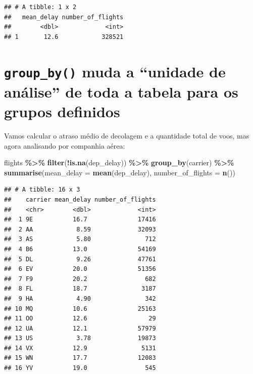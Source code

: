 \documentclass[
]{book}
\newenvironment{Shaded}{\begin{snugshade}}{\end{snugshade}}
\newcommand{\AttributeTok}[1]{\textcolor[rgb]{0.13,0.29,0.53}{#1}}
\newcommand{\FunctionTok}[1]{\textcolor[rgb]{0.13,0.29,0.53}{\textbf{#1}}}
\newcommand{\NormalTok}[1]{#1}
\newcommand{\SpecialCharTok}[1]{\textcolor[rgb]{0.81,0.36,0.00}{\textbf{#1}}}
\begin{document}
\begin{verbatim}
## # A tibble: 1 x 2
##   mean_delay number_of_flights
##        <dbl>             <int>
## 1       12.6            328521
\end{verbatim}

\section{\texorpdfstring{\texttt{group\_by()} muda a ``unidade de análise'' de toda a tabela para os grupos definidos}{group\_by() muda a ``unidade de análise'' de toda a tabela para os grupos definidos}}\label{group_by-muda-a-unidade-de-anuxe1lise-de-toda-a-tabela-para-os-grupos-definidos}

Vamos calcular o atraso médio de decolagem e a quantidade total de voos, mas agora analisando por companhia aérea:

\begin{Shaded}
\begin{Highlighting}[]
\NormalTok{flights }\SpecialCharTok{\%\textgreater{}\%}
    \FunctionTok{filter}\NormalTok{(}\SpecialCharTok{!}\FunctionTok{is.na}\NormalTok{(dep\_delay)) }\SpecialCharTok{\%\textgreater{}\%}
    \FunctionTok{group\_by}\NormalTok{(carrier) }\SpecialCharTok{\%\textgreater{}\%} 
    \FunctionTok{summarise}\NormalTok{(}\AttributeTok{mean\_delay =} \FunctionTok{mean}\NormalTok{(dep\_delay), }\AttributeTok{number\_of\_flights =} \FunctionTok{n}\NormalTok{())}
\end{Highlighting}
\end{Shaded}

\begin{verbatim}
## # A tibble: 16 x 3
##    carrier mean_delay number_of_flights
##    <chr>        <dbl>             <int>
##  1 9E           16.7              17416
##  2 AA            8.59             32093
##  3 AS            5.80               712
##  4 B6           13.0              54169
##  5 DL            9.26             47761
##  6 EV           20.0              51356
##  7 F9           20.2                682
##  8 FL           18.7               3187
##  9 HA            4.90               342
## 10 MQ           10.6              25163
## 11 OO           12.6                 29
## 12 UA           12.1              57979
## 13 US            3.78             19873
## 14 VX           12.9               5131
## 15 WN           17.7              12083
## 16 YV           19.0                545
\end{verbatim}
\end{document}
